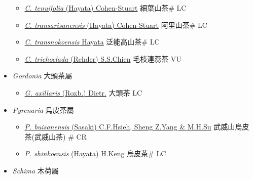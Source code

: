 \begin{itemize}
\begin{itemize}
        \item[] \href{http://www.theplantlist.org/tpl1.1/search?q=Camellia+tenuifolia}{\textit{C. tenuifolia} (Hayata) Cohen-Stuart}   細葉山茶\# LC
        \item[] \href{http://www.theplantlist.org/tpl1.1/search?q=Camellia+transarisanensis}{\textit{C. transarisanensis} (Hayata) Cohen-Stuart}   阿里山茶\# LC
        \item[] \href{http://www.theplantlist.org/tpl1.1/search?q=Camellia+transnokoensis}{\textit{C. transnokoensis} Hayata}   泛能高山茶\# LC
        \item[] \href{http://www.theplantlist.org/tpl1.1/search?q=Camellia+trichoclada}{\textit{C. trichoclada} (Rehder) S.S.Chien}   毛枝連蕊茶 VU
  \end{itemize}
 \item[] \textit{Gordonia} 大頭茶屬
                    
  \begin{itemize}
        \item[] \href{http://www.theplantlist.org/tpl1.1/search?q=Gordonia+axillaris}{\textit{G. axillaris} (Roxb.) Dietr.}   大頭茶 LC
  \end{itemize}
 \item[] \textit{Pyrenaria} 烏皮茶屬
                    
  \begin{itemize}
        \item[] \href{http://www.theplantlist.org/tpl1.1/search?q=Pyrenaria+buisanensis}{\textit{P. buisanensis} (Sasaki) C.F.Hsieh, Sheng Z.Yang \& M.H.Su}     武威山烏皮茶(武威山茶)  \# CR
        \item[] \href{http://www.theplantlist.org/tpl1.1/search?q=Pyrenaria+shinkoensis}{\textit{P. shinkoensis} (Hayata) H.Keng}   烏皮茶\# LC
  \end{itemize}
 \item[] \textit{Schima} 木荷屬
                    

\end{itemize}
